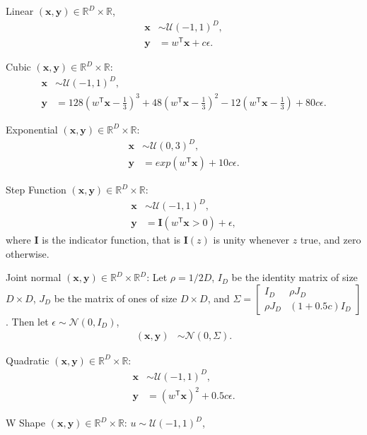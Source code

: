 \documentclass[11pt]{article}
\providecommand{\mb}[1]{\boldsymbol{#1}}
\providecommand{\mc}[1]{\mathcal{#1}}
\newcommand{\Real}{\mathbb{R}}
\newcommand{\T}{^{\ensuremath{\mathsf{T}}}}           %
\begin{document}
\setcounter{equation}{0}
\begin{compactenum}
\item Linear $(\mb{x},\mb{y}) \in \Real^{D} \times \Real$,
\begin{align*}
\mb{x} &\sim \mc{U}(-1,1)^{D},\\
\mb{y} &=w\T \mb{x}+c\epsilon.
\end{align*}
\item Cubic $(\mb{x},\mb{y}) \in \Real^{D} \times \Real$:
\begin{align*}
\mb{x} &\sim \mc{U}(-1,1)^{D}, \\
\mb{y} &=128(w\T \mb{x}-\tfrac{1}{3})^3+48(w\T \mb{x}-\tfrac{1}{3})^2-12(w\T \mb{x}-\tfrac{1}{3})+80c\epsilon.
\end{align*}
\item Exponential $(\mb{x},\mb{y}) \in \Real^{D} \times \Real$:
\begin{align*}
\mb{x} &\sim \mc{U}(0,3)^{D}, \\
\mb{y} &=exp(w\T \mb{x})+10c\epsilon.
\end{align*}
\item Step Function $(\mb{x},\mb{y}) \in \Real^{D} \times \Real$:
\begin{align*}
\mb{x} &\sim \mc{U}(-1,1)^{D},\\
\mb{y} &=\mb{I}(w\T \mb{x}>0)+\epsilon,
\end{align*}
where $\mb{I}$ is the indicator function, that is $\mb{I}(z)$ is unity whenever $z$ true, and zero otherwise.
\item Joint normal $(\mb{x},\mb{y}) \in \Real^{D} \times \Real^{D}$: Let $\rho=1/2D$, $I_{D}$ be the identity matrix of size $D \times D$, $J_{D}$ be the matrix of ones of size $D \times D$, and $\Sigma = \begin{bmatrix} I_{D}&\rho J_{D}\\ \rho J_{D}& (1+0.5c) I_{D} \end{bmatrix}$. Then let $\epsilon \sim \mc{N}(0, I_{D})$,
\begin{align*}
(\mb{x}, \mb{y}) &\sim \mc{N}(0, \Sigma). 
\end{align*}
\item Quadratic $(\mb{x},\mb{y}) \in \Real^{D} \times \Real$:
\begin{align*}
\mb{x} &\sim \mc{U}(-1,1)^{D},\\
\mb{y}&=(w\T \mb{x})^2+0.5c\epsilon.
\end{align*}
\item W Shape $(\mb{x},\mb{y}) \in \Real^{D} \times \Real$:  $u \sim \mc{U}(-1,1)^{D}$,

\end{compactenum}
\end{document}
